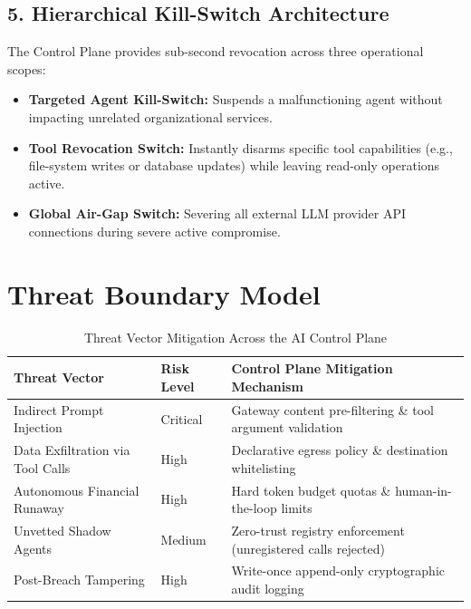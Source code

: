 \documentclass[11pt,a4paper]{article}
\begin{document}
\subsection{5. Hierarchical Kill-Switch Architecture}
The Control Plane provides sub-second revocation across three operational scopes:
\begin{itemize}
    \item \textbf{Targeted Agent Kill-Switch:} Suspends a malfunctioning agent without impacting unrelated organizational services.
    \item \textbf{Tool Revocation Switch:} Instantly disarms specific tool capabilities (e.g., file-system writes or database updates) while leaving read-only operations active.
    \item \textbf{Global Air-Gap Switch:} Severing all external LLM provider API connections during severe active compromise.
\end{itemize}

\section{Threat Boundary Model}

\begin{table}[htbp]
\centering
\caption{Threat Vector Mitigation Across the AI Control Plane}
\label{tab:threat_model}
\begin{tabular}{lll}
\toprule
\textbf{Threat Vector} & \textbf{Risk Level} & \textbf{Control Plane Mitigation Mechanism} \\
\midrule
Indirect Prompt Injection & Critical & Gateway content pre-filtering \& tool argument validation \\
Data Exfiltration via Tool Calls & High & Declarative egress policy \& destination whitelisting \\
Autonomous Financial Runaway & High & Hard token budget quotas \& human-in-the-loop limits \\
Unvetted Shadow Agents & Medium & Zero-trust registry enforcement (unregistered calls rejected) \\
Post-Breach Tampering & High & Write-once append-only cryptographic audit logging \\
\bottomrule
\end{tabular}
\end{table}
\end{document}

